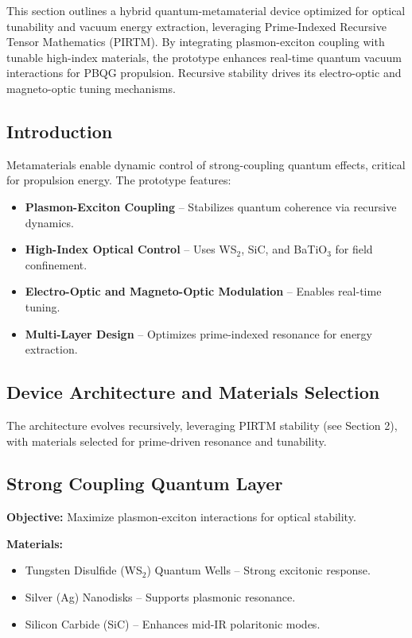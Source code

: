 \documentclass{article}
\theoremstyle{plain}
\begin{document}
This section outlines a hybrid quantum-metamaterial device optimized for optical tunability and vacuum energy extraction, leveraging Prime-Indexed Recursive Tensor Mathematics (PIRTM). By integrating plasmon-exciton coupling with tunable high-index materials, the prototype enhances real-time quantum vacuum interactions for PBQG propulsion. Recursive stability drives its electro-optic and magneto-optic tuning mechanisms.

\subsection{Introduction}
Metamaterials enable dynamic control of strong-coupling quantum effects, critical for propulsion energy. The prototype features:
\begin{itemize}
    \item \textbf{Plasmon-Exciton Coupling} – Stabilizes quantum coherence via recursive dynamics.
    \item \textbf{High-Index Optical Control} – Uses WS$_2$, SiC, and BaTiO$_3$ for field confinement.
    \item \textbf{Electro-Optic and Magneto-Optic Modulation} – Enables real-time tuning.
    \item \textbf{Multi-Layer Design} – Optimizes prime-indexed resonance for energy extraction.
\end{itemize}

\subsection{Device Architecture and Materials Selection}
The architecture evolves recursively, leveraging PIRTM stability (see Section 2), with materials selected for prime-driven resonance and tunability.

\subsection{Strong Coupling Quantum Layer}
\textbf{Objective:} Maximize plasmon-exciton interactions for optical stability.

\textbf{Materials:}
\begin{itemize}
    \item Tungsten Disulfide (WS$_2$) Quantum Wells – Strong excitonic response.
    \item Silver (Ag) Nanodisks – Supports plasmonic resonance.
    \item Silicon Carbide (SiC) – Enhances mid-IR polaritonic modes.
\end{itemize}
\end{document}
